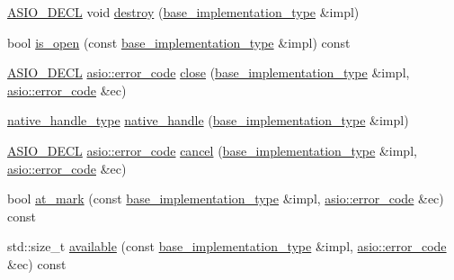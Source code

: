 \begin{DoxyCompactItemize}
\hyperlink{config_8hpp_ab54d01ea04afeb9a8b39cfac467656b7}{A\+S\+I\+O\+\_\+\+D\+E\+C\+L} void \hyperlink{classasio_1_1detail_1_1reactive__socket__service__base_af2bae08031d0eb279dd9dfcd037c2dd2}{destroy} (\hyperlink{structasio_1_1detail_1_1reactive__socket__service__base_1_1base__implementation__type}{base\+\_\+implementation\+\_\+type} \&impl)
\item 
bool \hyperlink{classasio_1_1detail_1_1reactive__socket__service__base_a3bacc9bb408d59f2b8a53a2c727a3a21}{is\+\_\+open} (const \hyperlink{structasio_1_1detail_1_1reactive__socket__service__base_1_1base__implementation__type}{base\+\_\+implementation\+\_\+type} \&impl) const 
\item 
\hyperlink{config_8hpp_ab54d01ea04afeb9a8b39cfac467656b7}{A\+S\+I\+O\+\_\+\+D\+E\+C\+L} \hyperlink{classasio_1_1error__code}{asio\+::error\+\_\+code} \hyperlink{classasio_1_1detail_1_1reactive__socket__service__base_af13091e137f3fbf653372d162916d28a}{close} (\hyperlink{structasio_1_1detail_1_1reactive__socket__service__base_1_1base__implementation__type}{base\+\_\+implementation\+\_\+type} \&impl, \hyperlink{classasio_1_1error__code}{asio\+::error\+\_\+code} \&ec)
\item 
\hyperlink{classasio_1_1detail_1_1reactive__socket__service__base_a7838f400a17a0a3e0fd1c78040f4da53}{native\+\_\+handle\+\_\+type} \hyperlink{classasio_1_1detail_1_1reactive__socket__service__base_a64c07944a73acadc4906d0ca6311bbc9}{native\+\_\+handle} (\hyperlink{structasio_1_1detail_1_1reactive__socket__service__base_1_1base__implementation__type}{base\+\_\+implementation\+\_\+type} \&impl)
\item 
\hyperlink{config_8hpp_ab54d01ea04afeb9a8b39cfac467656b7}{A\+S\+I\+O\+\_\+\+D\+E\+C\+L} \hyperlink{classasio_1_1error__code}{asio\+::error\+\_\+code} \hyperlink{classasio_1_1detail_1_1reactive__socket__service__base_a77501913e875d9cdca20e44f7317c86f}{cancel} (\hyperlink{structasio_1_1detail_1_1reactive__socket__service__base_1_1base__implementation__type}{base\+\_\+implementation\+\_\+type} \&impl, \hyperlink{classasio_1_1error__code}{asio\+::error\+\_\+code} \&ec)
\item 
bool \hyperlink{classasio_1_1detail_1_1reactive__socket__service__base_a3219949c6c15e260ccef10773143b0c3}{at\+\_\+mark} (const \hyperlink{structasio_1_1detail_1_1reactive__socket__service__base_1_1base__implementation__type}{base\+\_\+implementation\+\_\+type} \&impl, \hyperlink{classasio_1_1error__code}{asio\+::error\+\_\+code} \&ec) const 
\item 
std\+::size\+\_\+t \hyperlink{classasio_1_1detail_1_1reactive__socket__service__base_afc32bb4b58ce2c48b1c0a4feb47910b7}{available} (const \hyperlink{structasio_1_1detail_1_1reactive__socket__service__base_1_1base__implementation__type}{base\+\_\+implementation\+\_\+type} \&impl, \hyperlink{classasio_1_1error__code}{asio\+::error\+\_\+code} \&ec) const 

\end{DoxyCompactItemize}
